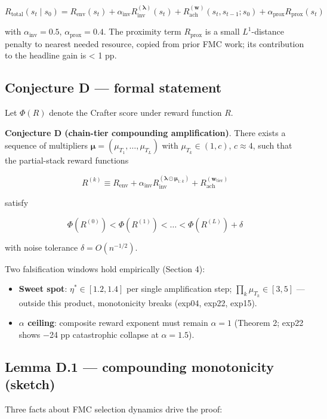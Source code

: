 \documentclass[11pt,letterpaper]{article}
\begin{document}
\[
R_{\text{total}}(s_t \mid s_0) = R_{\text{env}}(s_t) + \alpha_{\text{inv}} R_{\text{inv}}^{(\boldsymbol\lambda)}(s_t) + R_{\text{ach}}^{(\mathbf{w})}(s_t, s_{t-1}; s_0) + \alpha_{\text{prox}} R_{\text{prox}}(s_t)
\]

with $\alpha_{\text{inv}} = 0.5$, $\alpha_{\text{prox}} = 0.4$. The
proximity term $R_{\text{prox}}$ is a small $L^1$-distance penalty to
nearest needed resource, copied from prior FMC work; its contribution
to the headline gain is < 1 pp.

\subsection{Conjecture D — formal statement}

Let $\Phi(R)$ denote the Crafter score under reward function $R$.

\textbf{Conjecture D (chain-tier compounding amplification)}. There exists a
sequence of multipliers $\boldsymbol\mu = (\mu_{T_1}, \dots, \mu_{T_L})$
with $\mu_{T_k} \in (1, c)$, $c \approx 4$, such that the partial-stack
reward functions

\[
R^{(k)} \equiv R_{\text{env}} + \alpha_{\text{inv}} R_{\text{inv}}^{(\boldsymbol\lambda \odot \boldsymbol\mu_{1:k})} + R_{\text{ach}}^{(\mathbf{w}_{\text{tier}})}
\]

satisfy

\[
\Phi(R^{(0)}) < \Phi(R^{(1)}) < \dots < \Phi(R^{(L)}) + \delta
\]

with noise tolerance $\delta = O(n^{-1/2})$.

Two falsification windows hold empirically (Section 4):

\begin{itemize}
\item \textbf{Sweet spot}: $\eta^* \in [1.2, 1.4]$ per single amplification step; $\prod_k \mu_{T_k} \in [3, 5]$ — outside this product, monotonicity breaks (exp04, exp22, exp15).
\item \textbf{$\alpha$ ceiling}: composite reward exponent must remain $\alpha = 1$ (Theorem 2; exp22 shows −24 pp catastrophic collapse at $\alpha = 1.5$).
\end{itemize}
\subsection{Lemma D.1 — compounding monotonicity (sketch)}

Three facts about FMC selection dynamics drive the proof:
\end{document}
